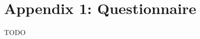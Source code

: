 \documentclass[letterpaper, 10 pt, conference]{ieeeconf}  %
\begin{document}

\addtolength{\textheight}{-12cm}   %







\section*{Appendix 1: Questionnaire}

TODO





\end{document}
